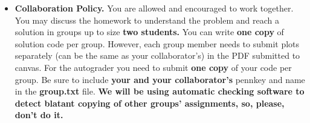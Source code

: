 {\begin{itemize}
If you are not familiar with Matlab or how Matlab functions work, you can refer to Matlab online documentation for help:
\begin{center}
\url{http://www.mathworks.com/help/matlab/}
\end{center}

In addition, please use built-in Matlab functions rather than external library functions. Without proper reference to external library, auto-grader may fail even if your code runs perfectly on your local machine. Also, please DO NOT include data file in your submission.


\item
\textbf{Collaboration Policy.} 
You are allowed and encouraged to work together. You may discuss the
homework to understand the problem and reach a solution in groups up
to size {\bf two students.} 
You can write {\bf one copy} of solution code per group. However, each group member needs to submit plots separately (can be the same as your collaborator's) in the PDF submitted to canvas.
For the autograder you need to submit {\bf one copy} of your code per group. Be sure to include {\bf your and your collaborator's} pennkey and name in the {\bf group.txt} file. {\bf We will be using automatic checking software to detect blatant copying of other groups' assignments, so,
please, don't do it.}

\end{itemize}

}

